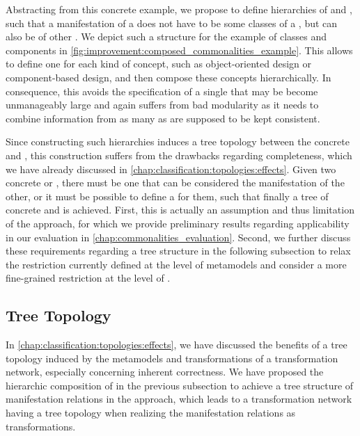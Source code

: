 Abstracting from this concrete example, we propose to define hierarchies of \commonalities and \conceptmetamodels, such that a manifestation of a \commonality does not have to be some classes of a \concretemetamodel, but can also be \commonalities of other \conceptmetamodels.
We depict such a structure for the example of classes and components in \autoref{fig:improvement:composed_commonalities_example}.
This allows to define one \conceptmetamodel for each kind of concept, such as object-oriented design or component-based design, and then compose these concepts hierarchically.
In consequence, this avoids the specification of a single \conceptmetamodel that may be become unmanageably large and again suffers from bad modularity as it needs to combine information from as many \concretemetamodels as are supposed to be kept consistent.

Since constructing such hierarchies induces a tree topology between the concrete and \conceptmetamodels, this construction suffers from the drawbacks regarding completeness, which we have already discussed in \autoref{chap:classification:topologies:effects}.
Given two concrete or \conceptmetamodels, there must be one that can be considered the manifestation of the other, or it must be possible to define a \conceptmetamodel for them, such that finally a tree of concrete and \conceptmetamodels is achieved.
First, this is actually an assumption and thus limitation of the approach, for which we provide preliminary results regarding applicability in our evaluation in \autoref{chap:commonalities_evaluation}.
Second, we further discuss these requirements regarding a tree structure in the following subsection to relax the restriction currently defined at the level of metamodels and consider a more fine-grained restriction at the level of \metaclasses.


\subsection{Tree Topology}
\label{chap:improvement:commonalities:tree}

In \autoref{chap:classification:topologies:effects}, we have discussed the benefits of a tree topology induced by the metamodels and transformations of a transformation network, especially concerning inherent correctness.
We have proposed the hierarchic composition of \conceptmetamodels in the previous subsection to achieve a tree structure of manifestation relations in the \commonalities approach, which leads to a transformation network having a tree topology when realizing the manifestation relations as transformations.

